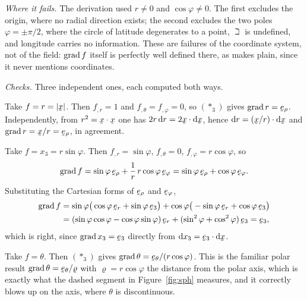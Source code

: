\begin{solution}
\emph{Where it fails.} The derivation used $r\neq0$ and $\cos\varphi\neq0$.
The first excludes the origin, where no radial direction exists; the second
excludes the two poles $\varphi=\pm\pi/2$, where the circle of latitude
degenerates to a point, $\beth$ is undefined, and longitude carries no
information. These are failures of the coordinate system, not of the field:
$\operatorname{grad} f$ itself is perfectly well defined there, as  makes plain,
since it never mentions coordinates.

\emph{Checks.} Three independent ones, each computed both ways.

Take $f=r=|\bx|$. Then $f_{,r}=1$ and $f_{,\theta}=f_{,\varphi}=0$, so
$(\ast_3)$ gives $\grad r=\berho$. Independently, from
$r^{2}=\ip\bx\bx$ one has $2r\,\dl r=2\ip\bx{\dl\bx}$, hence
$\dl r=\ip{(\bx/r)}{\dl\bx}$ and $\grad r=\bx/r=\berho$, in agreement.

Take $f=x_{3}=r\sin\varphi$. Then $f_{,r}=\sin\varphi$, $f_{,\theta}=0$,
$f_{,\varphi}=r\cos\varphi$, so
\[
   \grad f=\sin\varphi\,\berho+\frac{1}{r}\,r\cos\varphi\,\beph
          =\sin\varphi\,\berho+\cos\varphi\,\beph .
\]
Substituting the Cartesian forms of $\berho$ and $\beph$,
\[
\begin{aligned}
   \grad f&=\sin\varphi\big(\cos\varphi\,\ber+\sin\varphi\,\be_{3}\big)
           +\cos\varphi\big(-\sin\varphi\,\ber+\cos\varphi\,\be_{3}\big)\\
   &=(\sin\varphi\cos\varphi-\cos\varphi\sin\varphi)\,\ber
     +(\sin^{2}\varphi+\cos^{2}\varphi)\,\be_{3}=\be_{3},
\end{aligned}
\]
which is right, since $\grad x_{3}=\be_{3}$ directly from
$\dl x_{3}=\ip{\be_{3}}{\dl\bx}$.

Take $f=\theta$. Then $(\ast_3)$ gives
$\grad\theta=\beth/(r\cos\varphi)$. This is the familiar polar result
$\grad\theta=\beth/\varrho$ with $\varrho=r\cos\varphi$ the distance from
the polar axis, which is exactly what the dashed segment in
Figure~\ref{fig:sph} measures, and it correctly blows up on the axis, where
$\theta$ is discontinuous.
\end{solution}

